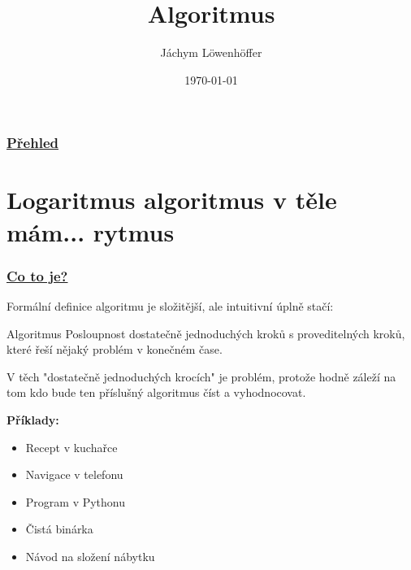 \documentclass{beamer}
\title[amogus]{Algoritmus} %
\author{Jáchym Löwenhöffer} %
\institute[GEVO] %
{
Gynekologická Evaluace Velkých Obrazů \\ %
\medskip
\textit{jachym.lowenhoffer@gmail.com} %
}
\date{\today} %
\begin{document}
\begin{frame}
	\titlepage %
\end{frame}

\begin{frame}
	\frametitle{\href{https://ksp.mff.cuni.cz/encyklopedie/zakladni-algoritmy/}{Přehled}} %
	\tableofcontents %
\end{frame}

\section{Logaritmus algoritmus v těle mám... rytmus}
\label{sec:turingus}


\begin{frame}
	\frametitle{\href{https://youtu.be/I9Vd6JP5D_0?si=Sj5GlSdduG39T4ZT}{Co to je?}}
Formální definice algoritmu je složitější, ale intuitivní úplně stačí:
\begin{block}{Algoritmus}
 Posloupnost dostatečně jednoduchých kroků s proveditelných kroků, které řeší
 nějaký problém v konečném čase. 
\end{block}
V těch "dostatečně jednoduchých krocích" je problém, protože hodně záleží na tom
kdo bude ten příslušný algoritmus číst a vyhodnocovat.

\textbf{Příklady:}
\begin{itemize}
 \item Recept v kuchařce
 \item Navigace v telefonu
 \item Program v Pythonu
 \item Čistá binárka
 \item Návod na složení nábytku
\end{itemize}


 \end{frame}
\end{document}
